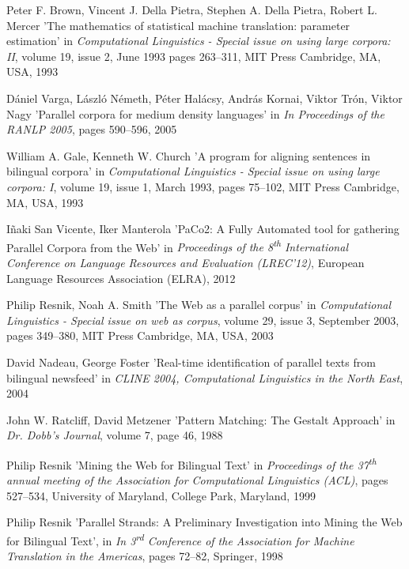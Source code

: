\begin{thebibliography}{99}
Peter F. Brown, Vincent J. Della Pietra, Stephen A. Della Pietra, Robert L. Mercer
'The mathematics of statistical machine translation: parameter estimation'
in \textit{Computational Linguistics - Special issue on using large corpora: II},
volume 19, issue 2, June 1993 
pages 263--311,
MIT Press Cambridge, MA, USA, 1993

Dániel Varga, László Németh, Péter Halácsy, András Kornai, Viktor Trón, Viktor Nagy
'Parallel corpora for medium density languages'
in \textit{In Proceedings of the RANLP 2005},
pages 590--596,
2005

William A. Gale, Kenneth W. Church
'A program for aligning sentences in bilingual corpora'
in \textit{Computational Linguistics - Special issue on using large corpora: I},
volume 19, issue 1, March 1993,
pages 75--102,
MIT Press Cambridge, MA, USA, 1993

Iñaki San Vicente, Iker Manterola
'PaCo2: A Fully Automated tool for gathering Parallel Corpora from the Web'
in \textit{Proceedings of the 8\textsuperscript{th} International Conference on Language Resources and Evaluation (LREC'12)},
European Language Resources Association (ELRA), 2012

Philip Resnik, Noah A. Smith
'The Web as a parallel corpus'
in \textit{Computational Linguistics - Special issue on web as corpus},
volume 29, issue 3, September 2003,
pages 349--380,
MIT Press Cambridge, MA, USA, 2003

David Nadeau, George Foster
'Real-time identification of parallel texts from bilingual newsfeed'
in \textit{CLINE 2004, Computational Linguistics in the North East},
2004

John W. Ratcliff, David Metzener
'Pattern Matching: The Gestalt Approach'
in \textit{Dr. Dobb's Journal},
volume 7,
page 46,
1988

Philip Resnik
'Mining the Web for Bilingual Text'
in \textit{Proceedings of the 37\textsuperscript{th} annual meeting of the Association for Computational Linguistics (ACL)},
pages 527--534,
University of Maryland, College Park, Maryland, 1999

Philip Resnik
'Parallel Strands: A Preliminary Investigation into Mining the Web for Bilingual Text',
in \textit{In 3\textsuperscript{rd} Conference of the Association for Machine Translation in the Americas},
pages 72--82,
Springer, 
1998


\end{thebibliography}
